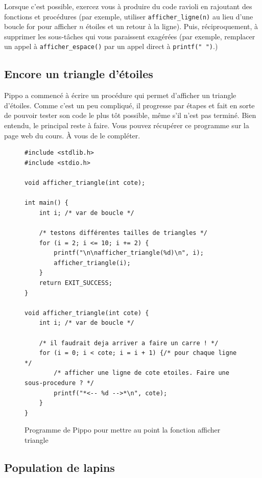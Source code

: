Lorsque c'est possible, exercez vous à produire du code ravioli en
rajoutant des fonctions et procédures (par exemple, utiliser \verb+afficher_ligne(n)+
au lieu d'une boucle for pour afficher $n$ étoiles et un retour à la ligne). Puis, réciproquement, à
supprimer les sous-tâches qui vous paraissent exagérées (par exemple, remplacer un appel
à \verb+afficher_espace()+ par un appel direct à \verb+printf(" ")+.)


\subsection{Encore un triangle d'étoiles}
Pippo a commencé à écrire un procédure qui permet d'afficher un
triangle d'étoiles. Comme c'est un peu compliqué, il progresse par étapes
et fait en sorte de pouvoir tester son code le plus tôt possible, même
s'il n'est pas terminé.  Bien entendu, le principal reste à
faire. Vous pouvez récupérer ce programme sur la page web du cours. À vous de
le compléter. 

\begin{figure}[tb]
  \begin{small}
\begin{verbatim}
#include <stdlib.h>
#include <stdio.h>

void afficher_triangle(int cote);

int main() {
    int i; /* var de boucle */

    /* testons différentes tailles de triangles */
    for (i = 2; i <= 10; i += 2) {
        printf("\n\nafficher_triangle(%d)\n", i);
        afficher_triangle(i);
    }
    return EXIT_SUCCESS;
} 

void afficher_triangle(int cote) {
    int i; /* var de boucle */

    /* il faudrait deja arriver a faire un carre ! */
    for (i = 0; i < cote; i = i + 1) {/* pour chaque ligne */
        /* afficher une ligne de cote etoiles. Faire une sous-procedure ? */
        printf("*<-- %d -->*\n", cote);
    }
}
\end{verbatim}
\vspace{-0.5cm}
  \end{small}
  \caption{Programme de Pippo pour mettre au point la fonction afficher triangle}
\label{fig:triangle}
\end{figure}




\subsection{Population de lapins}


